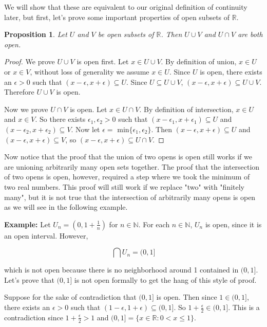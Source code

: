 \documentclass[a4paper]{article}
\newtheorem{prop}[theorem]{Proposition}
\numberwithin{theorem}{section}
\begin{document}
We will show that these are equivalent to our original definition of continuity later, but first, let's prove some important properties of open subsets of $\mathbb{R}$.

\begin{prop}
Let $U$ and $V$ be open subsets of $\mathbb{R}$. Then $U \cup V$ and $U \cap V$ are both open.
\end{prop}

\begin{proof}
We prove $U \cup V$ is open first. Let $x \in U \cup V$. By definition of union, $x \in U$ or $x \in V$, without loss of generality we assume $x \in U$. Since $U$ is open, there exists an $\epsilon > 0$ such that $(x-\epsilon,x+\epsilon) \subseteq U$. Since $U \subseteq U \cup V$, $(x-\epsilon,x+\epsilon) \subseteq U \cup V$. Therefore $U \cup V$ is open.

Now we prove $U \cap V$ is open. Let $x \in U \cap V$. By definition of intersection, $x \in U$ and $x \in V$. So there exists $\epsilon_1,\epsilon_2 > 0$ such that $(x-\epsilon_1,x+\epsilon_1) \subseteq U$ and $(x-\epsilon_2,x+\epsilon_2) \subseteq V$. Now let $\epsilon = \textrm{ min} \{\epsilon_1,\epsilon_2\}$. Then $(x-\epsilon,x+\epsilon) \subseteq U$ and $(x-\epsilon,x+\epsilon) \subseteq V$, so $(x-\epsilon,x+\epsilon) \subseteq U \cap V$.

\end{proof}

Now notice that the proof that the union of two opens is open still works if we are unioning arbitrarily many open sets together. The proof that the intersection of two opens is open, however, required a step where we took the minimum of two real numbers. This proof will still work if we replace "two" with "finitely many", but it is not true that the intersection of arbitrarily many opens is open as we will see in the following example.

\textbf{Example:}
Let $U_n = (0,1+ \frac{1}{n})$ for $n \in \mathbb{N}$. For each $n \in \mathbb{N}$, $U_n$ is open, since it is an open interval. However,

$$ \bigcap U_n = (0,1] $$

which is not open because there is no neighborhood around 1 contained in $(0,1]$. Let's prove that $(0,1]$ is not open formally to get the hang of this style of proof. 

Suppose for the sake of contradiction that $(0,1]$ is open. Then since $1 \in (0,1]$, there exists an $\epsilon > 0$ such that $(1-\epsilon, 1+\epsilon) \subseteq (0,1]$. So $1+\frac{\epsilon}{2} \in (0,1]$. This is a contradiction since $1+\frac{\epsilon}{2} > 1$ and $(0,1] = \{x \in \mathbb{R}: 0<x\leq 1\}$.
\end{document}
